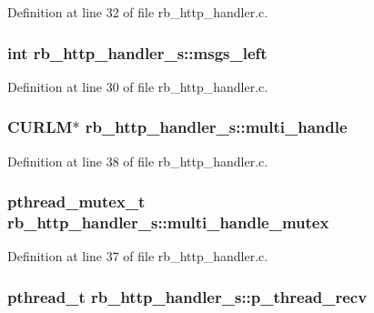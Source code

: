 Definition at line 32 of file rb\-\_\-http\-\_\-handler.\-c.

\hypertarget{structrb__http__handler__s_a803db851c00a617f8a80f00f29d9dba3}{
\subsubsection[{msgs\-\_\-left}]{\setlength{\rightskip}{0pt plus 5cm}int rb\-\_\-http\-\_\-handler\-\_\-s\-::msgs\-\_\-left}}\label{structrb__http__handler__s_a803db851c00a617f8a80f00f29d9dba3}


Definition at line 30 of file rb\-\_\-http\-\_\-handler.\-c.

\hypertarget{structrb__http__handler__s_a45c0ce1f2e4d154d0194bb60569c0faf}{
\subsubsection[{multi\-\_\-handle}]{\setlength{\rightskip}{0pt plus 5cm}C\-U\-R\-L\-M$\ast$ rb\-\_\-http\-\_\-handler\-\_\-s\-::multi\-\_\-handle}}\label{structrb__http__handler__s_a45c0ce1f2e4d154d0194bb60569c0faf}


Definition at line 38 of file rb\-\_\-http\-\_\-handler.\-c.

\hypertarget{structrb__http__handler__s_add4e2b7495e2f20396c2e70ab1a27bf4}{
\subsubsection[{multi\-\_\-handle\-\_\-mutex}]{\setlength{\rightskip}{0pt plus 5cm}pthread\-\_\-mutex\-\_\-t rb\-\_\-http\-\_\-handler\-\_\-s\-::multi\-\_\-handle\-\_\-mutex}}\label{structrb__http__handler__s_add4e2b7495e2f20396c2e70ab1a27bf4}


Definition at line 37 of file rb\-\_\-http\-\_\-handler.\-c.

\hypertarget{structrb__http__handler__s_a4d36d51983f56eac71371a39ee421242}{
\subsubsection[{p\-\_\-thread\-\_\-recv}]{\setlength{\rightskip}{0pt plus 5cm}pthread\-\_\-t rb\-\_\-http\-\_\-handler\-\_\-s\-::p\-\_\-thread\-\_\-recv}}\label{structrb__http__handler__s_a4d36d51983f56eac71371a39ee421242}



